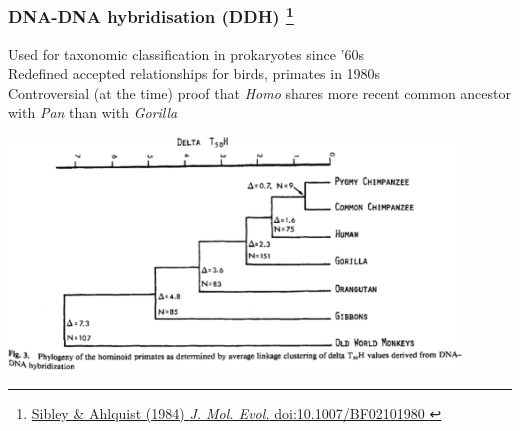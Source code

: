 %
\begin{frame}
  \frametitle{DNA-DNA hybridisation (DDH)
  \footnote{\tiny{\href{http://dx.doi.org/10.1007/BF02101980
}{Sibley \& Ahlquist (1984) \textit{J. Mol. Evol.} doi:10.1007/BF02101980
}}}  
  }
  Used for taxonomic classification in prokaryotes since '60s \\
  \textcolor{hutton_green}{Redefined accepted relationships for birds, primates in 1980s} \\
  \textcolor{RawSienna}{Controversial (at the time) proof that \textit{Homo} shares more recent common ancestor with \textit{Pan} than with \textit{Gorilla}}
  \begin{center}
    \includegraphics[width=0.9\textwidth]{images/dna-dna_primates} \\
  \end{center}  
\end{frame}


